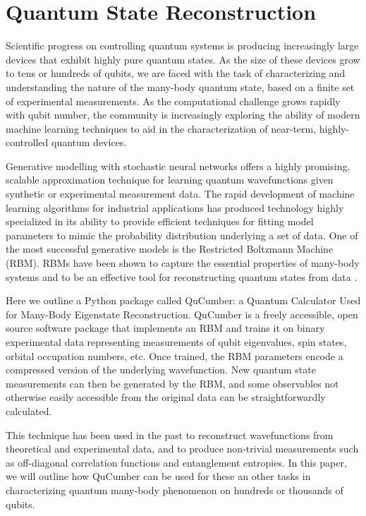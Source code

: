 \documentclass[submission, Phys]{SciPost}
\begin{document}
\section{Quantum State Reconstruction}

Scientific progress on controlling quantum systems is producing increasingly large devices that exhibit highly pure quantum states.  As the size of these devices grow to tens or hundreds of qubits, we are faced with the task of characterizing and understanding the nature of the many-body quantum state, based on a finite set of experimental measurements.  As the computational challenge grows rapidly with qubit number, the community is increasingly exploring the ability of modern machine learning techniques to aid in the characterization of near-term, highly-controlled quantum devices.

Generative modelling with stochastic neural networks offers a highly promising, scalable approximation technique for learning quantum wavefunctions given synthetic or experimental measurement data.  The rapid development of machine learning algorithms for industrial applications has produced technology highly specialized in its ability to provide efficient techniques for fitting model parameters to mimic the probability distribution underlying a set of data.  One of the most successful generative models is the Restricted Boltzmann Machine (RBM).  RBMs have been shown to capture the essential properties of many-body systems and to be an effective tool for reconstructing quantum states from data \cite{Torlai2016thermo, torlai2018tomography, CarleoTroyer2017Science}.

Here we outline a Python package called QuCumber: a Quantum Calculator Used for Many-Body Eigenstate Reconstruction.  QuCumber is a freely accessible, open source software package that implements an RBM and trains it on binary experimental data representing measurements of qubit eigenvalues, spin states, orbital occupation numbers, etc.  Once trained, the RBM parameters encode a compressed version of the underlying wavefunction.  New quantum state measurements can then be generated by the RBM, and some observables not otherwise easily accessible from the original data can be straightforwardly calculated.

This technique has been used in the past to reconstruct wavefunctions from theoretical and experimental data, and to produce non-trivial measurements such as off-diagonal correlation functions and entanglement entropies.
In this paper, we will outline how QuCumber can be used for these an other tasks in characterizing quantum many-body phenomenon on hundreds or thousands of qubits.
\end{document}

